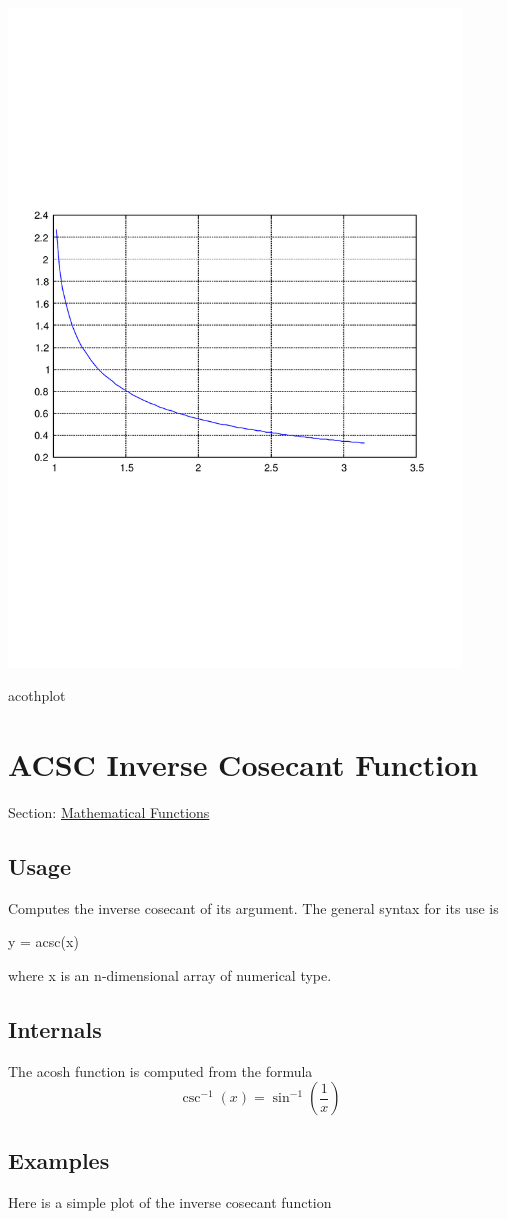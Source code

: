  
\begin{DoxyImage}
\includegraphics[width=12cm]{acothplot}
\caption{acothplot}
\end{DoxyImage}
 \hypertarget{mathfunctions_acsc}{}\section{A\-C\-S\-C Inverse Cosecant Function}\label{mathfunctions_acsc}
Section\-: \hyperlink{sec_mathfunctions}{Mathematical Functions} \hypertarget{vtkwidgets_vtkxyplotwidget_Usage}{}\subsection{Usage}\label{vtkwidgets_vtkxyplotwidget_Usage}
Computes the inverse cosecant of its argument. The general syntax for its use is \begin{DoxyVerb}  y = acsc(x)
\end{DoxyVerb}
 where {\ttfamily x} is an {\ttfamily n}-\/dimensional array of numerical type. \hypertarget{transforms_svd_Function}{}\subsection{Internals}\label{transforms_svd_Function}
The {\ttfamily acosh} function is computed from the formula \[ \csc^{-1}(x) = \sin^{-1}\left(\frac{1}{x}\right) \] \hypertarget{variables_matrix_Examples}{}\subsection{Examples}\label{variables_matrix_Examples}
Here is a simple plot of the inverse cosecant function


